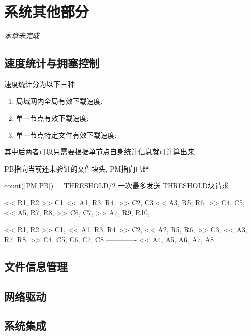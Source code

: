 \chapter{系统其他部分}
{\em 本章未完成}
\section{速度统计与拥塞控制}
速度统计分为以下三种
\begin{enumerate}
	\item 局域网内全局有效下载速度;
	\item 单一节点有效下载速度;
	\item 单一节点特定文件有效下载速度;
\end{enumerate}

其中后两者可以只需要根据单节点自身统计信息就可计算出来

PB指向当前还未验证的文件块头, PM指向已经

count([PM,PB]) = THRESHOLD/2
一次最多发送 THRESHOLD块请求

<< R1, R2
>> C1
<< A1, R3, R4, %
>> C2, C3
<< A3, R5, R6,
>> C4, C5,
<< A5, R7, R8,
>> C6, C7,
>> A7, R9, R10,

<< R1, R2
>> C1,
<< A1, R3, R4
>> C2,
<< A2, R5, R6,
>> C3,
<< A3, R7, R8,
>> C4, C5, C6, C7, C8
-------------
<< A4, A5, A6, A7, A8




\section{文件信息管理}
\section{网络驱动}
\section{系统集成}
